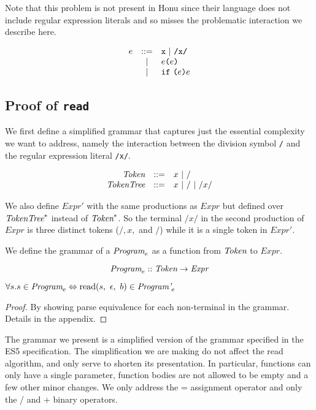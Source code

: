 \documentclass[onecolumn]{sigplanconf-onecolumn}
\begin{document}
Note that this problem is not present in Honu since their language does not include regular expression literals and so misses the problematic interaction we describe here.

\[
\begin{array}{rcl}
  e &::=& \texttt{x} ~|~ \texttt{/x/} \\
  &|& e \texttt{(}e\texttt{)} \\
  &|& \texttt{if}~\texttt{(}e\texttt{)}e
\end{array}
\]

\subsection{Proof of \texttt{read}}
\label{sec-3-1}

We first define a simplified grammar that captures just the essential
complexity we want to address, namely the interaction between
the division symbol \texttt{/} and the regular expression literal
\texttt{/x/}.

\[
\begin{array}{rrl}
  \textit{Token} &::=& x ~|~ /
  \\
  \textit{TokenTree} &::=& x ~|~ / ~|~ /x/
  \\
\end{array}
\]

We also define \( \textit{Expr}' \) with the same productions as \(
\textit{Expr} \) but defined over \( \textit{TokenTree}^{*} \) instead of \( \textit{Token}^{*}
\). So the terminal \( /x/ \) in the second production of \(
\textit{Expr} \) is three distinct tokens (\( /, x, \) and \( /
\)) while it is a single token in \( \textit{Expr}' \).

We define the grammar of a \( \textit{Program}_{e} \) as a function from
\( \textit{Token} \) to \( \textit{Expr} \).

\[
\textit{Program}_{e} :: \textit{Token} \rightarrow \textit{Expr}
\]

\begin{theorem}\mbox{}

  \( \forall s. s \in \textit{Program}_{e} \Leftrightarrow 
  \textrm{read}(s,~\epsilon,~b) \in \textit{Program'}_{e} \)

\end{theorem}
\begin{proof}\mbox{}
  
By showing parse equivalence for each non-terminal in the grammar.
Details in the appendix.
\end{proof}

The grammar we present is a simplified version of the grammar
specified in the ES5 specification. The simplification we are making
do not affect the read algorithm, and only serve to shorten its
presentation. In particular, functions can only have a single
parameter, function bodies are not allowed to be empty and a few other
minor changes. We only address the = assignment operator and only the
/ and + binary operators.
\end{document}
